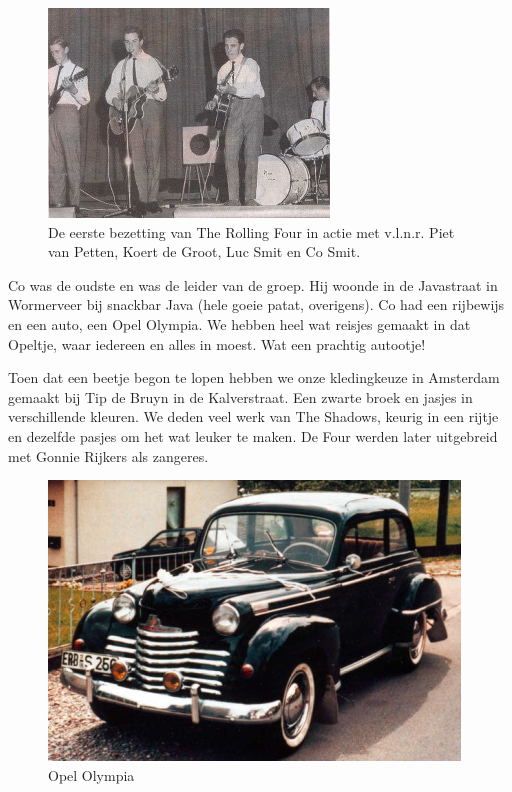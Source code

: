 \documentclass[10pt,twoside, openright]{memoir}
\begin{document}
\begin{figure}[t]
\includegraphics[width=\textwidth]{img/ch33/four}
\caption*{\footnotesize De eerste bezetting van The Rolling Four in actie met v.l.n.r. Piet van Petten, Koert de Groot, Luc Smit en Co Smit.}
\end{figure}

Co was de oudste en was de leider van de groep. Hij woonde in de Javastraat in Wormerveer bij snackbar Java (hele goeie patat, overigens). Co had een rijbewijs en een auto, een Opel Olympia. We hebben heel wat reisjes gemaakt in dat Opeltje, waar iedereen en alles in moest. Wat een prachtig autootje!

Toen dat een beetje begon te lopen hebben we onze kledingkeuze in Amsterdam gemaakt bij Tip de Bruyn in de Kalverstraat. Een zwarte broek en jasjes in verschillende kleuren. We deden veel werk van The Shadows, keurig in een rijtje en dezelfde pasjes om het wat leuker te maken. De Four werden later uitgebreid met Gonnie Rijkers als zangeres. 

\begin{figure}
\includegraphics[width=\textwidth]{img/ch26/opel_olympia_big}
\caption*{\footnotesize Opel Olympia}
\end{figure}
\end{document}
